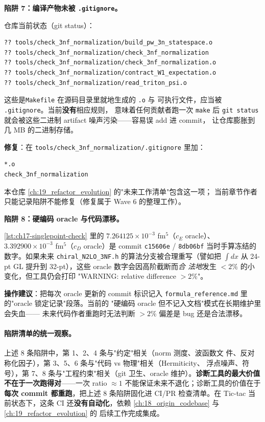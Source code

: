 \begin{pitfallbox}[label={box:ch17-pitfall-binary-artifacts}]
\textbf{陷阱 7：编译产物未被 \texttt{.gitignore}。}

仓库当前状态（git status）：

\begin{verbatim}
?? tools/check_3nf_normalization/build_pw_3n_statespace.o
?? tools/check_3nf_normalization/check_3nf_normalization
?? tools/check_3nf_normalization/check_3nf_normalization.o
?? tools/check_3nf_normalization/contract_W1_expectation.o
?? tools/check_3nf_normalization/read_triton_psi.o
\end{verbatim}

这些是\texttt{Makefile} 在源码目录里就地生成的 \texttt{.o} 与
可执行文件，应当被 \texttt{.gitignore}。当前\textbf{没有}相应规则，
意味着任何贡献者跑一次 \texttt{make} 后 \texttt{git status}
就会被这些二进制 artifact 噪声污染——容易误 add 进 commit，
让仓库膨胀到几 MB 的二进制存储。

\textbf{修复}：在 \texttt{tools/check\_3nf\_normalization/.gitignore}
里加：
\begin{verbatim}
*.o
check_3nf_normalization
\end{verbatim}
本仓库 \cref{ch:19_refactor_evolution} 的"未来工作清单"包含这一项；
当前章节作者只能记录陷阱不能修复（修复属于 Wave 6 的整理工作）。
\end{pitfallbox}

\begin{pitfallbox}[label={box:ch17-pitfall-oracle-staleness}]
\textbf{陷阱 8：硬编码 oracle 与代码漂移。}

\cref{lst:ch17-singlepoint-check} 里的
\(7.264125 \times 10^{-3}\) fm\(^5\)（\(c_E\) oracle）、
\(3.392900 \times 10^{-3}\) fm\(^5\)（\(c_D\) oracle）是 commit
\texttt{c15606e} / \texttt{8db06bf} 当时手算冻结的数字。如果未来
\texttt{chiral\_N2LO\_3NF.h} 的算法分支被合理重写（譬如把 \(\int dx\)
从 24-pt GL 提升到 32-pt），这些 oracle 数字会因高阶截断而\emph{合
法地}发生 \(<2\%\) 的小变化，但工具仍会打印 "WARNING: relative
difference \(>2\%\)"。

\textbf{操作建议}：把每次 oracle 更新的 commit 标识记入
\texttt{formula\_reference.md} 里的"oracle 锁定记录"段落。当前的
"硬编码 oracle 但不记入文档"模式在长期维护里会失血——
未来代码作者重跑时无法判断 \(>2\%\) 偏差是 bug 还是合法漂移。
\end{pitfallbox}

\paragraph{陷阱清单的统一观察。}
上述 8 条陷阱中，第 1、2、4 条与"约定"相关（norm 测度、波函数文
件、反对称化因子），第 3、5、6 条与"代码 vs 物理"相关（Hermiticity、
浮点噪声、符号），第 7、8 条与"工程约束"相关（git 卫生、oracle
维护）。\textbf{诊断工具的最大价值不在于一次跑得对}——一次 ratio
\(\approx 1\) 不能保证未来不退化；诊断工具的价值在于\textbf{每次
commit 都重跑}，把上述 8 条陷阱固化进 CI/PR 检查清单。在
Tic-tac 当前状态下，这条 CI 还\textbf{没有自动化}，依赖
\cref{ch:18_origin_codebase} 与 \cref{ch:19_refactor_evolution} 的
后续工作完成集成。

